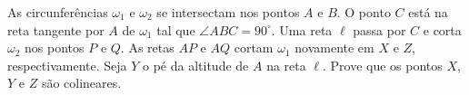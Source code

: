 As circunferências $\omega_1$ e $\omega_2$ se intersectam nos pontos $A$ e $B$. O ponto $C$ está na reta tangente por $A$ de $\omega_1$ tal que $\angle ABC = 90^\circ$.
Uma reta $\ell$ passa por $C$ e corta $\omega_2$ nos pontos $P$ e $Q$. As retas $AP$ e $AQ$ cortam $\omega_1$ novamente em $X$ e $Z$, respectivamente. Seja $Y$ o pé da altitude de $A$ na reta $\ell$. Prove que os pontos $X$, $Y$ e $Z$ são colineares.
